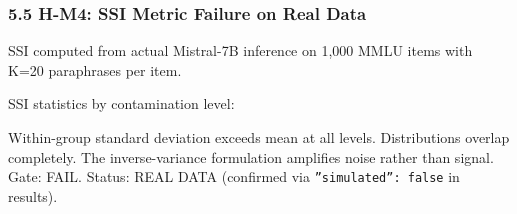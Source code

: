 \subsubsection{5.5 H-M4: SSI Metric Failure on Real Data}

SSI computed from actual Mistral-7B inference on 1,000 MMLU items with K=20 paraphrases per item.

\begin{table}[htbp]
\centering
{}
\end{table}

SSI statistics by contamination level:

\begin{table}[htbp]
\centering
{}
\end{table}

Within-group standard deviation exceeds mean at all levels. Distributions overlap completely. The inverse-variance formulation amplifies noise rather than signal. Gate: FAIL. Status: REAL DATA (confirmed via \texttt{''simulated'': false} in results).

